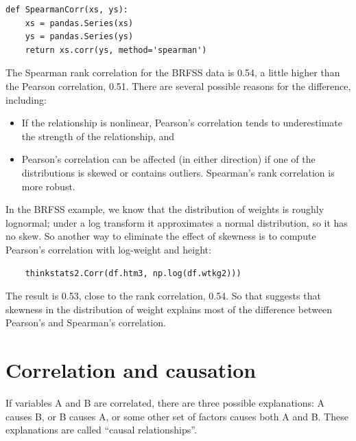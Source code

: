 \begin{verbatim}
def SpearmanCorr(xs, ys):
    xs = pandas.Series(xs)
    ys = pandas.Series(ys)
    return xs.corr(ys, method='spearman')
\end{verbatim}

The Spearman rank correlation for the BRFSS data is 0.54, a little
higher than the Pearson correlation, 0.51.  There are several possible
reasons for the difference, including:

\begin{itemize}

\item If the relationship is
nonlinear, Pearson's correlation tends to underestimate the strength
of the relationship, and 

\item Pearson's correlation can be affected (in either direction)
if one of the distributions is skewed or contains outliers.  Spearman's
rank correlation is more robust.

\end{itemize}

In the BRFSS example, we know that the distribution of weights is
roughly lognormal; under a log transform it approximates a normal
distribution, so it has no skew.
So another way to eliminate the effect of skewness is to
compute Pearson's
correlation with log-weight and height:

\begin{verbatim}
    thinkstats2.Corr(df.htm3, np.log(df.wtkg2)))
\end{verbatim}

The result is 0.53, close to the rank correlation, 0.54.  So that
suggests that skewness in the distribution of weight explains most of
the difference between Pearson's and Spearman's correlation.


\section{Correlation and causation}

If variables A and B are correlated, there are three possible
explanations: A causes B, or B causes A, or some other set of factors
causes both A and B.  These explanations are called ``causal
relationships''.

